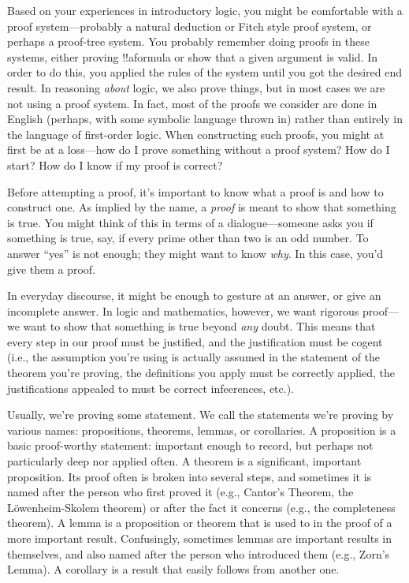 \documentclass[../../../include/open-logic-section]{subfiles}
\begin{document}


Based on your experiences in introductory logic, you might be
comfortable with a proof system---probably a natural deduction or
Fitch style proof system, or perhaps a proof-tree system. You probably
remember doing proofs in these systems, either proving !!a{formula}
or show that a given argument is valid. In order to do this, you
applied the rules of the system until you got the desired end
result. In reasoning \emph{about} logic, we also prove things, but in
most cases we are not using a proof system. In fact, most of the
proofs we consider are done in English (perhaps, with some symbolic
language thrown in) rather than entirely in the language of
first-order logic.  When constructing such proofs, you might at first
be at a loss---how do I prove something without a proof system?  How
do I start? How do I know if my proof is correct?

Before attempting a proof, it's important to know what a proof is and
how to construct one.  As implied by the name, a \emph{proof} is meant
to show that something is true. You might think of this in terms of a
dialogue---someone asks you if something is true, say, if every prime
other than two is an odd number. To answer ``yes'' is not enough; they
might want to know \emph{why}. In this case, you'd give them a proof.

In everyday discourse, it might be enough to gesture at an answer, or
give an incomplete answer. In logic and mathematics, however, we want
rigorous proof---we want to show that something is true beyond \emph{any}
doubt. This means that every step in our proof must be justified, and
the justification must be cogent (i.e., the assumption you're using is
actually assumed in the statement of the theorem you're proving, the
definitions you apply must be correctly applied, the justifications
appealed to must be correct infeerences, etc.).

Usually, we're proving some statement. We call the statements we're
proving by various names: propositions, theorems, lemmas, or
corollaries.  A proposition is a basic proof-worthy statement:
important enough to record, but perhaps not particularly deep nor
applied often. A theorem is a significant, important proposition. Its
proof often is broken into several steps, and sometimes it is named
after the person who first proved it (e.g., Cantor's Theorem, the
L\"owenheim-Skolem theorem) or after the fact it concerns (e.g., the
completeness theorem).  A lemma is a proposition or theorem that is
used to in the proof of a more important result. Confusingly,
sometimes lemmas are important results in themselves, and also named
after the person who introduced them (e.g., Zorn's Lemma). A corollary
is a result that easily follows from another one.
\end{document}
